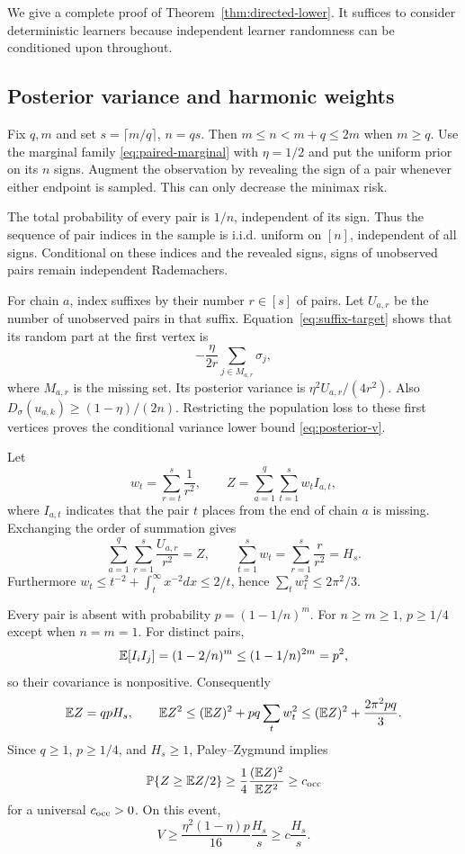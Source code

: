 We give a complete proof of Theorem~\ref{thm:directed-lower}. It suffices to consider deterministic
learners because independent learner randomness can be conditioned upon throughout.

\subsection{Posterior variance and harmonic weights}

Fix $q,m$ and set $s=\lceil m/q\rceil$, $n=qs$. Then $m\le n<m+q\le2m$ when $m\ge q$.
Use the marginal family \eqref{eq:paired-marginal} with $\eta=1/2$ and put the uniform prior on its
$n$ signs. Augment the observation by revealing the sign of a pair whenever either endpoint is
sampled. This can only decrease the minimax risk.

The total probability of every pair is $1/n$, independent of its sign. Thus the sequence of pair
indices in the sample is i.i.d. uniform on $[n]$, independent of all signs. Conditional on these
indices and the revealed signs, signs of unobserved pairs remain independent Rademachers.

For chain $a$, index suffixes by their number $r\in[s]$ of pairs. Let $U_{a,r}$ be the number of
unobserved pairs in that suffix. Equation~\eqref{eq:suffix-target} shows that its random part at
the first vertex is
\[
 -\frac{\eta}{2r}\sum_{j\in M_{a,r}}\sigma_j,
\]
where $M_{a,r}$ is the missing set. Its posterior variance is $\eta^2U_{a,r}/(4r^2)$. Also
$D_\sigma(u_{a,k})\ge(1-\eta)/(2n)$. Restricting the population loss to these first vertices proves
the conditional variance lower bound \eqref{eq:posterior-v}.

Let
\[
 w_t=\sum_{r=t}^s\frac1{r^2},\qquad
 Z=\sum_{a=1}^q\sum_{t=1}^s w_t I_{a,t},
\]
where $I_{a,t}$ indicates that the pair $t$ places from the end of chain $a$ is missing. Exchanging
the order of summation gives
\begin{equation}
 \sum_{a=1}^q\sum_{r=1}^s\frac{U_{a,r}}{r^2}=Z,
 \qquad
 \sum_{t=1}^s w_t=\sum_{r=1}^s\frac{r}{r^2}=H_s.
 \label{eq:weight-identities}
\end{equation}
Furthermore $w_t\le t^{-2}+\int_t^\infty x^{-2}dx\le2/t$, hence
$\sum_tw_t^2\le2\pi^2/3$.

Every pair is absent with probability $p=(1-1/n)^m$. For $n\ge m\ge1$, $p\ge1/4$ except when
$n=m=1$. For distinct pairs,
\[
 \mathbb E[I_iI_j]=(1-2/n)^m\le(1-1/n)^{2m}=p^2,
\]
so their covariance is nonpositive. Consequently
\[
 \mathbb E Z=q pH_s,
 \qquad
 \mathbb E Z^2\le(\mathbb E Z)^2+p q\sum_tw_t^2
 \le(\mathbb E Z)^2+\frac{2\pi^2pq}{3}.
\]
Since $q\ge1$, $p\ge1/4$, and $H_s\ge1$, Paley--Zygmund implies
\begin{equation}
 \mathbb P\{Z\ge \mathbb E Z/2\}
 \ge\frac{1}{4}\frac{(\mathbb E Z)^2}{\mathbb E Z^2}
 \ge c_{\rm occ}
 \label{eq:occupancy-pz}
\end{equation}
for a universal $c_{\rm occ}>0$. On this event,
\begin{equation}
 V\ge \frac{\eta^2(1-\eta)p}{16}\frac{H_s}{s}
 \ge c\frac{H_s}{s}.
 \label{eq:v-event}
\end{equation}

